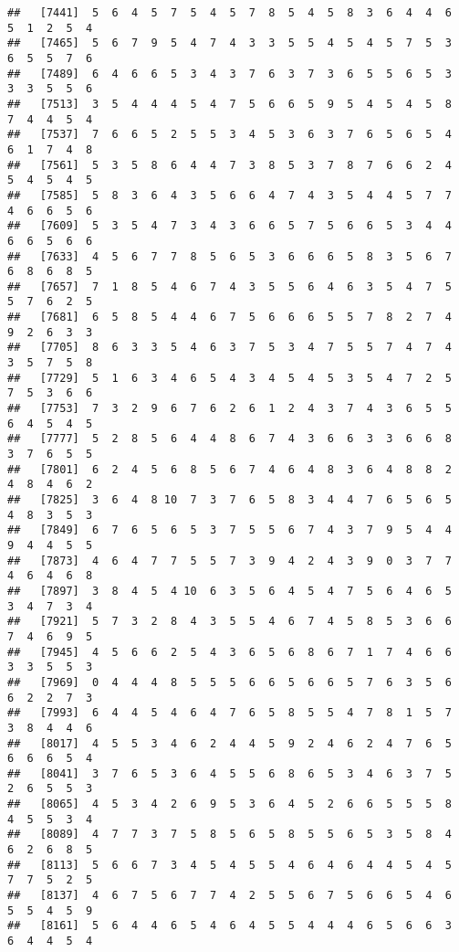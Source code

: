 \documentclass[
]{book}
\begin{document}
\begin{verbatim}
##   [7441]  5  6  4  5  7  5  4  5  7  8  5  4  5  8  3  6  4  4  6  5  1  2  5  4
##   [7465]  5  6  7  9  5  4  7  4  3  3  5  5  4  5  4  5  7  5  3  6  5  5  7  6
##   [7489]  6  4  6  6  5  3  4  3  7  6  3  7  3  6  5  5  6  5  3  3  3  5  5  6
##   [7513]  3  5  4  4  4  5  4  7  5  6  6  5  9  5  4  5  4  5  8  7  4  4  5  4
##   [7537]  7  6  6  5  2  5  5  3  4  5  3  6  3  7  6  5  6  5  4  6  1  7  4  8
##   [7561]  5  3  5  8  6  4  4  7  3  8  5  3  7  8  7  6  6  2  4  5  4  5  4  5
##   [7585]  5  8  3  6  4  3  5  6  6  4  7  4  3  5  4  4  5  7  7  4  6  6  5  6
##   [7609]  5  3  5  4  7  3  4  3  6  6  5  7  5  6  6  5  3  4  4  6  6  5  6  6
##   [7633]  4  5  6  7  7  8  5  6  5  3  6  6  6  5  8  3  5  6  7  6  8  6  8  5
##   [7657]  7  1  8  5  4  6  7  4  3  5  5  6  4  6  3  5  4  7  5  5  7  6  2  5
##   [7681]  6  5  8  5  4  4  6  7  5  6  6  6  5  5  7  8  2  7  4  9  2  6  3  3
##   [7705]  8  6  3  3  5  4  6  3  7  5  3  4  7  5  5  7  4  7  4  3  5  7  5  8
##   [7729]  5  1  6  3  4  6  5  4  3  4  5  4  5  3  5  4  7  2  5  7  5  3  6  6
##   [7753]  7  3  2  9  6  7  6  2  6  1  2  4  3  7  4  3  6  5  5  6  4  5  4  5
##   [7777]  5  2  8  5  6  4  4  8  6  7  4  3  6  6  3  3  6  6  8  3  7  6  5  5
##   [7801]  6  2  4  5  6  8  5  6  7  4  6  4  8  3  6  4  8  8  2  4  8  4  6  2
##   [7825]  3  6  4  8 10  7  3  7  6  5  8  3  4  4  7  6  5  6  5  4  8  3  5  3
##   [7849]  6  7  6  5  6  5  3  7  5  5  6  7  4  3  7  9  5  4  4  9  4  4  5  5
##   [7873]  4  6  4  7  7  5  5  7  3  9  4  2  4  3  9  0  3  7  7  4  6  4  6  8
##   [7897]  3  8  4  5  4 10  6  3  5  6  4  5  4  7  5  6  4  6  5  3  4  7  3  4
##   [7921]  5  7  3  2  8  4  3  5  5  4  6  7  4  5  8  5  3  6  6  7  4  6  9  5
##   [7945]  4  5  6  6  2  5  4  3  6  5  6  8  6  7  1  7  4  6  6  3  3  5  5  3
##   [7969]  0  4  4  4  8  5  5  5  6  6  5  6  6  5  7  6  3  5  6  6  2  2  7  3
##   [7993]  6  4  4  5  4  6  4  7  6  5  8  5  5  4  7  8  1  5  7  3  8  4  4  6
##   [8017]  4  5  5  3  4  6  2  4  4  5  9  2  4  6  2  4  7  6  5  6  6  6  5  4
##   [8041]  3  7  6  5  3  6  4  5  5  6  8  6  5  3  4  6  3  7  5  2  6  5  5  3
##   [8065]  4  5  3  4  2  6  9  5  3  6  4  5  2  6  6  5  5  5  8  4  5  5  3  4
##   [8089]  4  7  7  3  7  5  8  5  6  5  8  5  5  6  5  3  5  8  4  6  2  6  8  5
##   [8113]  5  6  6  7  3  4  5  4  5  5  4  6  4  6  4  4  5  4  5  7  7  5  2  5
##   [8137]  4  6  7  5  6  7  7  4  2  5  5  6  7  5  6  6  5  4  6  5  5  4  5  9
##   [8161]  5  6  4  4  6  5  4  6  4  5  5  4  4  4  6  5  6  6  3  6  4  4  5  4

\end{verbatim}
\end{document}
